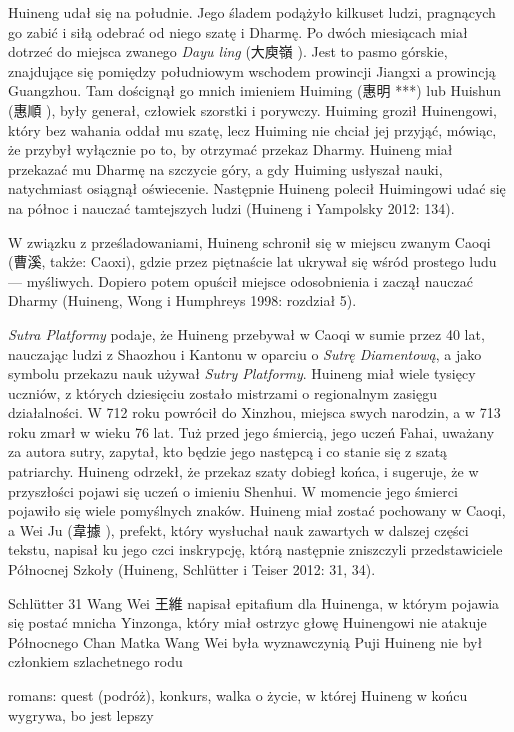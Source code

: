 Huineng udał się na południe. Jego śladem podążyło kilkuset ludzi, pragnących go zabić i siłą odebrać od niego szatę i Dharmę. Po dwóch miesiącach miał dotrzeć do miejsca zwanego \textit{Dayu ling} (大庾嶺 ). Jest to pasmo górskie, znajdujące się pomiędzy południowym wschodem prowincji Jiangxi a prowincją Guangzhou. Tam doścignął go mnich imieniem Huiming (惠明 ***) lub Huishun (惠順 ), były generał, człowiek szorstki i porywczy. Huiming groził Huinengowi, który bez wahania oddał mu szatę, lecz Huiming nie chciał jej przyjąć, mówiąc, że przybył wyłącznie po to, by otrzymać przekaz Dharmy. Huineng miał przekazać mu Dharmę na szczycie góry, a gdy Huiming usłyszał nauki, natychmiast osiągnął oświecenie. Następnie Huineng polecił Huimingowi udać się na północ i nauczać tamtejszych ludzi (Huineng i Yampolsky 2012: 134).

W związku z prześladowaniami, Huineng schronił się w miejscu zwanym Caoqi (曹溪, także: Caoxi), gdzie przez piętnaście lat ukrywał się wśród prostego ludu --- myśliwych. Dopiero potem opuścił miejsce odosobnienia i zaczął nauczać Dharmy (Huineng, Wong i Humphreys 1998: rozdział 5).

\textit{Sutra Platformy} podaje, że Huineng przebywał w Caoqi w sumie przez 40 lat, nauczając ludzi z Shaozhou i Kantonu w oparciu o \textit{Sutrę Diamentową}, a jako symbolu przekazu nauk używał \textit{Sutry Platformy}. Huineng miał wiele tysięcy uczniów, z których dziesięciu zostało mistrzami o regionalnym zasięgu działalności. W 712 roku powrócił do Xinzhou, miejsca swych narodzin, a w 713 roku zmarł w wieku 76 lat. Tuż przed jego śmiercią, jego uczeń Fahai, uważany za autora sutry, zapytał, kto będzie jego następcą i co stanie się z szatą patriarchy. Huineng odrzekł, że przekaz szaty dobiegł końca, i sugeruje, że w przyszłości pojawi się uczeń o imieniu Shenhui. W momencie jego śmierci pojawiło się wiele pomyślnych znaków. Huineng miał zostać pochowany w Caoqi, a Wei Ju (韋據 ), prefekt, który wysłuchał nauk zawartych w dalszej części tekstu, napisał ku jego czci inskrypcję, którą następnie zniszczyli przedstawiciele Północnej Szkoły (Huineng, Schlütter i Teiser 2012: 31, 34).

Schlütter 31
Wang Wei 王維 napisał epitafium dla Huinenga, w którym pojawia się postać mnicha Yinzonga, który miał ostrzyc głowę Huinengowi
nie atakuje Północnego Chan
Matka Wang Wei była wyznawczynią Puji
Huineng nie był członkiem szlachetnego rodu

romans: quest (podróż), konkurs, walka o życie, w której Huineng w końcu wygrywa, bo jest lepszy

